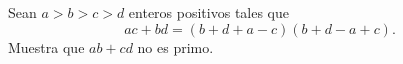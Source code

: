 Sean $a\gt b\gt c\gt d$ enteros positivos tales que \[ ac + bd = (b+d+a-c)(b+d-a+c). \] Muestra que $ab + cd$ no es primo.